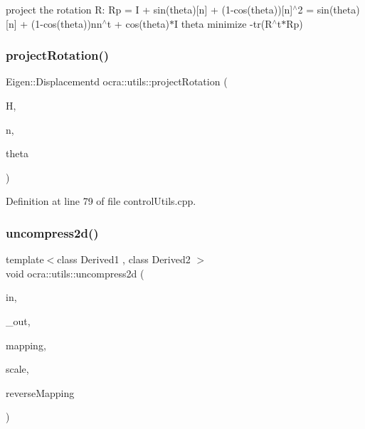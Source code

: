 project the rotation R\+: Rp = I + sin(theta)\mbox{[}n\mbox{]} + (1-\/cos(theta))\mbox{[}n\mbox{]}$^\wedge$2 = sin(theta)\mbox{[}n\mbox{]} + (1-\/cos(theta))nn$^\wedge$t + cos(theta)$\ast$I theta minimize -\/tr(R$^\wedge$t$\ast$\+Rp) \hypertarget{namespaceocra_1_1utils_a07cf93b22e02458b2c184ddd5787a6b2}{}\label{namespaceocra_1_1utils_a07cf93b22e02458b2c184ddd5787a6b2} 
\subsubsection{\texorpdfstring{project\+Rotation()}{projectRotation()}\hspace{0.1cm}{\footnotesize\ttfamily [2/2]}}
{\footnotesize\ttfamily Eigen\+::\+Displacementd ocra\+::utils\+::project\+Rotation (\begin{DoxyParamCaption}\item[{const Eigen\+::\+Displacementd \&}]{H,  }\item[{const Vector3d \&}]{n,  }\item[{double \&}]{theta }\end{DoxyParamCaption})}



Definition at line 79 of file control\+Utils.\+cpp.

\hypertarget{namespaceocra_1_1utils_a6336653c4ed344718fdf1c888c668a58}{}\label{namespaceocra_1_1utils_a6336653c4ed344718fdf1c888c668a58} 
\subsubsection{\texorpdfstring{uncompress2d()}{uncompress2d()}\hspace{0.1cm}{\footnotesize\ttfamily [1/2]}}
{\footnotesize\ttfamily template$<$class Derived1 , class Derived2 $>$ \\
void ocra\+::utils\+::uncompress2d (\begin{DoxyParamCaption}\item[{const Matrix\+Base$<$ Derived1 $>$ \&}]{in,  }\item[{Matrix\+Base$<$ Derived2 $>$ const \&}]{\+\_\+out,  }\item[{const std\+::vector$<$ int $>$ \&}]{mapping,  }\item[{double}]{scale,  }\item[{bool}]{reverse\+Mapping }\end{DoxyParamCaption})\hspace{0.3cm}{\ttfamily [inline]}}



